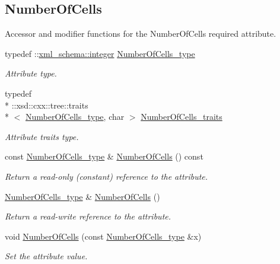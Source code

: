 \subsection*{Number\-Of\-Cells}
\label{_amgrp967ac3c5aad15a640629bb3adc1fc287}%
Accessor and modifier functions for the Number\-Of\-Cells required attribute. \begin{DoxyCompactItemize}
\item 
typedef \-::\hyperlink{namespacexml__schema_aaaea7c8ce4dfbe26cc52c91c29c97b7c}{xml\-\_\-schema\-::integer} \hyperlink{classPieceUnstructuredGrid__t_aeae5546900c50a4abe9b3aea485e97d0}{Number\-Of\-Cells\-\_\-type}
\begin{DoxyCompactList}\small\item\em Attribute type. \end{DoxyCompactList}\item 
typedef \\*
\-::xsd\-::cxx\-::tree\-::traits\\*
$<$ \hyperlink{classPieceUnstructuredGrid__t_aeae5546900c50a4abe9b3aea485e97d0}{Number\-Of\-Cells\-\_\-type}, char $>$ \hyperlink{classPieceUnstructuredGrid__t_a7c7607d306bde9e187b9cb3f570d6155}{Number\-Of\-Cells\-\_\-traits}
\begin{DoxyCompactList}\small\item\em Attribute traits type. \end{DoxyCompactList}\item 
const \hyperlink{classPieceUnstructuredGrid__t_aeae5546900c50a4abe9b3aea485e97d0}{Number\-Of\-Cells\-\_\-type} \& \hyperlink{classPieceUnstructuredGrid__t_a6e395db39208cc81f9d7093c50d5d334}{Number\-Of\-Cells} () const 
\begin{DoxyCompactList}\small\item\em Return a read-\/only (constant) reference to the attribute. \end{DoxyCompactList}\item 
\hyperlink{classPieceUnstructuredGrid__t_aeae5546900c50a4abe9b3aea485e97d0}{Number\-Of\-Cells\-\_\-type} \& \hyperlink{classPieceUnstructuredGrid__t_abe5f21a859d968d4b23a9b7ad790a7b3}{Number\-Of\-Cells} ()
\begin{DoxyCompactList}\small\item\em Return a read-\/write reference to the attribute. \end{DoxyCompactList}\item 
void \hyperlink{classPieceUnstructuredGrid__t_a25296cecd9f9c30f8c75ed8b750c1ad7}{Number\-Of\-Cells} (const \hyperlink{classPieceUnstructuredGrid__t_aeae5546900c50a4abe9b3aea485e97d0}{Number\-Of\-Cells\-\_\-type} \&x)
\begin{DoxyCompactList}\small\item\em Set the attribute value. \end{DoxyCompactList}\end{DoxyCompactItemize}
